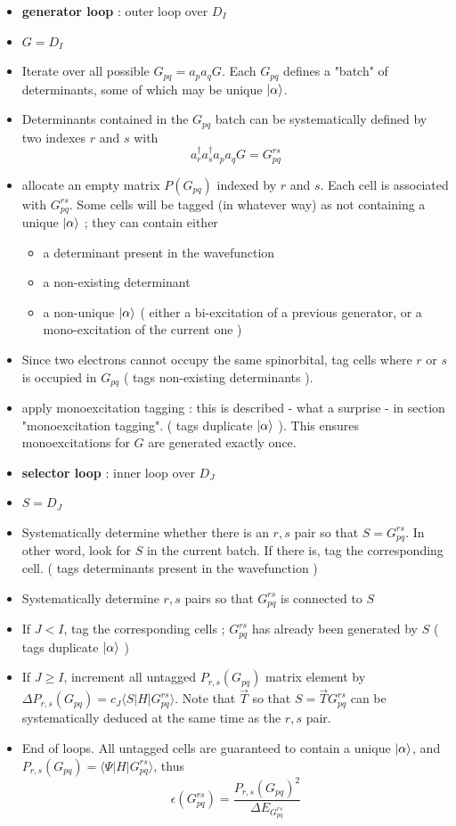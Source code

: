 \documentclass[./thesis.tex]{subfiles}
\begin{document}
\begin{itemize}
\item
\textbf{generator loop} : outer loop over $D_I$
\item
$G = D_I$
\item
Iterate over all possible $G_{pq} = a_p a_q G$. Each $G_{pq}$ defines a "batch" of determinants, some of which may be unique $\ket \alpha$.
\item
Determinants contained in the $G_{pq}$ batch can be systematically defined by two indexes $r$ and $s$ with
$$a^\dagger_r a^\dagger_s a_p a_q  G = G^{rs}_{pq}$$
\item
allocate an empty matrix $P(G_{pq})$ indexed by $r$ and $s$. Each cell is associated with $G^{rs}_{pq}$. Some cells will be tagged (in whatever way) as not containing a unique $\ket \alpha$ ; they can contain either
\begin{itemize}
\item
a determinant present in the wavefunction
\item
a non-existing determinant
\item
a non-unique $\ket \alpha$ ( either a bi-excitation of a previous generator, or a mono-excitation of the current one )
\end{itemize}

\item
Since two electrons cannot occupy the same spinorbital, tag cells where $r$ or $s$ is occupied in $G_{pq}$ ( tags non-existing determinants ). 
\item
apply monoexcitation tagging : this is described - what a surprise - in section "monoexcitation tagging". ( tags duplicate $\ket \alpha$ ). This ensures monoexcitations for $G$ are generated exactly once.
\item
\textbf{selector loop} : inner loop over $D_J$ 
\item
$S = D_J$
\item
Systematically determine whether there is an $r,s$ pair so that $S=G_{pq}^{rs}$. In other word, look for $S$ in the current batch. If there is, tag the corresponding cell. ( tags determinants present in the wavefunction )
\item
Systematically determine $r,s$ pairs so that $G_{pq}^{rs}$ is connected to $S$
\item
If $J<I$, tag the corresponding cells ; $G_{pq}^{rs}$ has already been generated by $S$ ( tags duplicate $\ket \alpha$ )
\item
If $J \geq I$, increment all untagged $P_{r,s}(G_{pq})$ matrix element by $\Delta P_{r,s}(G_{pq}) = c_J\langle S| H|  G^{rs}_{pq} \rangle$. Note that $\overrightarrow{T}$ so that $S=\overrightarrow{T}G^{rs}_{pq}$ can be systematically deduced at the same time as the $r,s$ pair.
\item
End of loops. All untagged cells are guaranteed to contain a unique $\ket \alpha$, and $P_{r,s}(G_{pq}) = \langle \Psi |H|G^{rs}_{pq} \rangle$, thus\\
$$\epsilon(G_{pq}^{rs}) = \frac{P_{r,s}(G_{pq})^2}{\Delta E_{G^{rs}_{pq}}}$$
\end{itemize}
\end{document}
